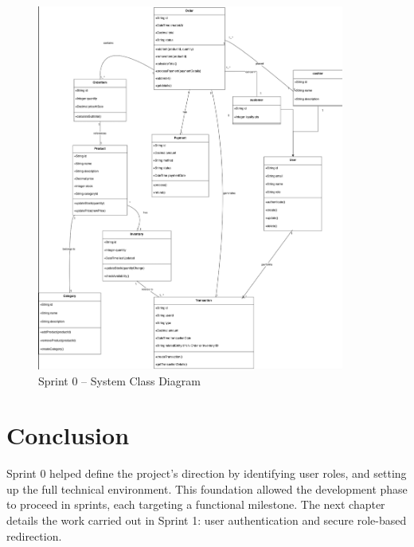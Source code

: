 \begin{figure}[H]
  \centering
  \includegraphics[width=0.9\textwidth]{figures/images/sprint0class.png}
  \caption{Sprint 0 – System Class Diagram}
  \label{fig:sprint0-class}
\end{figure}

\section{Conclusion}

Sprint 0 helped define the project's direction by identifying user roles, and setting up the full technical environment. This foundation allowed the development phase to proceed in sprints, each targeting a functional milestone. The next chapter details the work carried out in Sprint 1: user authentication and secure role-based redirection.